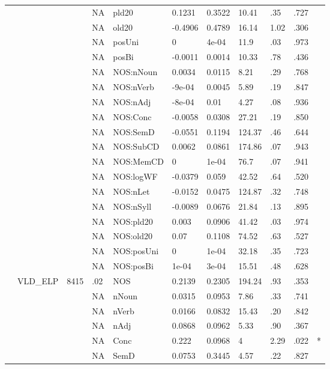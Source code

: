 \begin{table}[ht]
\begin{tabular}{lllllllllll}
   &  &  & NA & pld20 & 0.1231 & 0.3522 & 10.41 & .35 & .727 &   \\ 
   &  &  & NA & old20 & -0.4906 & 0.4789 & 16.14 & 1.02 & .306 &   \\ 
   &  &  & NA & posUni & 0 & 4e-04 & 11.9 & .03 & .973 &   \\ 
   &  &  & NA & posBi & -0.0011 & 0.0014 & 10.33 & .78 & .436 &   \\ 
   &  &  & NA & NOS:nNoun & 0.0034 & 0.0115 & 8.21 & .29 & .768 &   \\ 
   &  &  & NA & NOS:nVerb & -9e-04 & 0.0045 & 5.89 & .19 & .847 &   \\ 
   &  &  & NA & NOS:nAdj & -8e-04 & 0.01 & 4.27 & .08 & .936 &   \\ 
   &  &  & NA & NOS:Conc & -0.0058 & 0.0308 & 27.21 & .19 & .850 &   \\ 
   &  &  & NA & NOS:SemD & -0.0551 & 0.1194 & 124.37 & .46 & .644 &   \\ 
   &  &  & NA & NOS:SubCD & 0.0062 & 0.0861 & 174.86 & .07 & .943 &   \\ 
   &  &  & NA & NOS:MemCD & 0 & 1e-04 & 76.7 & .07 & .941 &   \\ 
   &  &  & NA & NOS:logWF & -0.0379 & 0.059 & 42.52 & .64 & .520 &   \\ 
   &  &  & NA & NOS:nLet & -0.0152 & 0.0475 & 124.87 & .32 & .748 &   \\ 
   &  &  & NA & NOS:nSyll & -0.0089 & 0.0676 & 21.84 & .13 & .895 &   \\ 
   &  &  & NA & NOS:pld20 & 0.003 & 0.0906 & 41.42 & .03 & .974 &   \\ 
   &  &  & NA & NOS:old20 & 0.07 & 0.1108 & 74.52 & .63 & .527 &   \\ 
   &  &  & NA & NOS:posUni & 0 & 1e-04 & 32.18 & .35 & .723 &   \\ 
   &  &  & NA & NOS:posBi & 1e-04 & 3e-04 & 15.51 & .48 & .628 &   \\ 
   & VLD\_ELP & 8415 & .02 & NOS & 0.2139 & 0.2305 & 194.24 & .93 & .353 &   \\ 
   &  &  & NA & nNoun & 0.0315 & 0.0953 & 7.86 & .33 & .741 &   \\ 
   &  &  & NA & nVerb & 0.0166 & 0.0832 & 15.43 & .20 & .842 &   \\ 
   &  &  & NA & nAdj & 0.0868 & 0.0962 & 5.33 & .90 & .367 &   \\ 
   &  &  & NA & Conc & 0.222 & 0.0968 & 4 & 2.29 & .022 & * \\ 
   &  &  & NA & SemD & 0.0753 & 0.3445 & 4.57 & .22 & .827 &   \\ 

\end{tabular}
\end{table}
